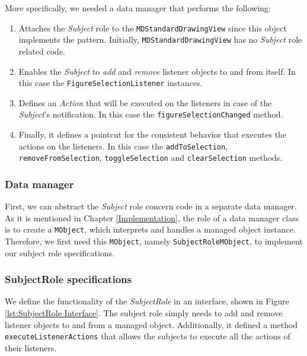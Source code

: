 More specifically, we needed a data manager that performs the following:

\begin{enumerate}
	\item Attaches the \textit{Subject} role to the \texttt{MDStandardDrawingView} since this object implements the pattern.
	Initially, \texttt{MDStandardDrawingView} has no \textit{Subject} role related code.

	\item Enables the \textit{Subject} to \textit{add} and \textit{remove} listener objects to and from itself. 
	\newline
	In this case the \texttt{FigureSelectionListener} instances.

	\item Defines an \textit{Action} that will be executed on the listeners in case of the \textit{Subject}'s notification.
	\newline
	In this case the \texttt{figureSelectionChanged} method.

	\item Finally, it defines a pointcut for the consistent behavior that executes the actions on the listeners. 
	In this case the \texttt{addToSelection}, \texttt{removeFromSelection}, \texttt{toggleSelection} and \texttt{clearSelection} methods.
\end{enumerate}

\subsubsection{Data manager}
First, we can abstract the \textit{Subject} role concern code in a separate data manager.
As it is mentioned in Chapter \ref{Implementation}, the role of a data manager class is to create a \texttt{MObject}, which interprets and handles a managed object instance.
Therefore, we first need this \texttt{MObject}, namely \texttt{SubjectRoleMObject}, to implement our subject role specifications.

\subsubsection{SubjectRole specifications}
We define the functionality of the \textit{SubjectRole} in an interface, shown in Figure \ref{lst:SubjectRole Interface}.
The subject role simply needs to add and remove listener objects to and from a managed object.
Additionally, it defined a method \texttt{executeListenerActions} that allows the subjects to execute all the actions of their listeners.


